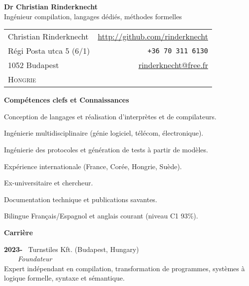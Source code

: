 \documentclass[a4paper,11pt]{article}
\begin{document}
\begin{center}
\textbf{\LARGE Dr Christian Rinderknecht}\\[5mm]
{\large Ingénieur compilation, langages dédiés, méthodes formelles}
\end{center}

\noindent
\begin{tabular}{@{}l@{\qquad\qquad\qquad\qquad}r@{}}
  Christian Rinderknecht
& \url{http://github.com/rinderknecht}\\
  Régi Posta utca 5 (6/1)
& \texttt{+36 70 311 6130}\\
  1052 Budapest
& \url{rinderknecht@free.fr}\\
  \textsc{Hongrie}
&
\end{tabular}

\medskip


\pagestyle{empty}

\bigskip
\noindent\textbf{\large Compétences clefs et Connaissances}
\begin{itemize*}

  \item Conception de langages et réalisation d'interprètes et de
    compilateurs.

  \item Ingénierie multidisciplinaire (génie logiciel, télécom,
    électronique).

  \item Ingénierie des protocoles et génération de tests à partir de
    modèles.

  \item Expérience internationale (France, Corée, Hongrie, Suède).

  \item Ex-universitaire et chercheur.

  \item Documentation technique et publications savantes.

  \item Bilingue Français/Espagnol et anglais courant (niveau C1 93\%).

\end{itemize*}

\bigskip

\noindent\textbf{\large Carrière}
\bigskip

\noindent\textbf{2023-} \ \textsf{Turnstiles Kft.} (Budapest,
Hungary)\\ \ \ \ \ \emph{Foundateur}\\
Expert indépendant en compilation, transformation de programmes,
systèmes à logique formelle, syntaxe et sémantique.
\end{document}
